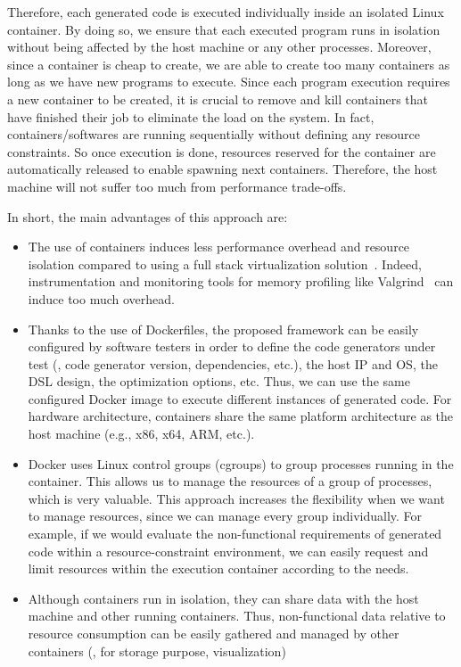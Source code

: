 Therefore, each generated code is executed individually inside an isolated Linux container. By doing so, we ensure that each executed program runs in isolation without being affected by the host machine or any other processes. Moreover, since a container is cheap to create, we are able to create too many containers as long as we have new programs to execute.  
Since each program execution requires a new container to be created, it is crucial to remove and kill containers that have finished their job to eliminate the load on the system. In fact, containers/softwares are running sequentially without defining any resource constraints. So once execution is done, resources reserved for the container are automatically released to enable spawning next containers. Therefore, the host machine will not suffer too much from performance trade-offs.

In short, the main advantages of this approach are:
\begin{itemize}
	\item The use of containers induces less performance overhead and resource isolation compared to using a full stack virtualization solution~\cite{spoiala2016performance}. Indeed, instrumentation and monitoring tools for memory profiling like Valgrind~\cite{nethercote2007valgrind} can induce too much overhead.
	\item Thanks to the use of Dockerfiles, the proposed framework can be easily configured by software testers in order to define the code generators under test (\eg, code generator version, dependencies, etc.), the host IP and OS, the DSL design, the optimization options, etc. Thus, we can use the same configured Docker image to execute different instances of generated code. For hardware architecture, containers share the same platform architecture as the host machine (e.g., x86, x64, ARM, etc.). 
	\item Docker uses Linux control groups (cgroups) to group processes running in the container. This allows us to manage the resources of a group of processes, which is very valuable. 
	This approach increases the flexibility when we want to manage resources, since we can manage every group individually. For example, if we would evaluate the non-functional requirements of generated code within a resource-constraint environment, we can easily request and limit resources within the execution container according to the needs.
	\item Although containers run in isolation, they can share data with the host machine and other running containers. Thus, non-functional data relative to resource consumption can be easily gathered and managed by other containers (\ie, for storage purpose, visualization)
\end{itemize}




